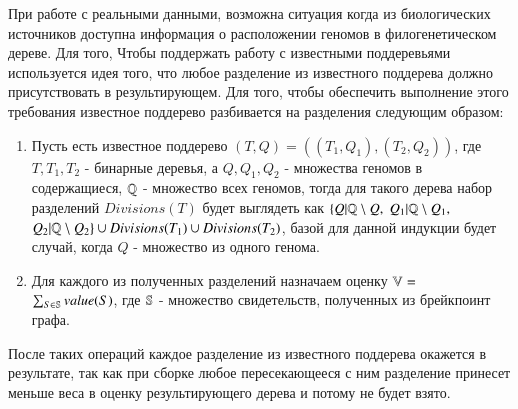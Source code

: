 При работе с реальными данными, возможна ситуация когда из биологических источников доступна информация о расположении геномов в филогенетическом дереве.
Для того, Чтобы поддержать работу с известными поддеревьями используется идея того, что любое разделение из известного поддерева должно присутствовать в результирующем.
Для того, чтобы обеспечить выполнение этого требования известное поддерево разбивается на разделения следующим образом:
\begin{enumerate}
  \item Пусть есть известное поддерево $(T, Q) = ((T_1, Q_1), (T_2, Q_2))$, где $T, T_1, T_2$ - бинарные деревья,
    а $Q, Q_1, Q_2$ - множества геномов в содержащиеся, $\mathbb{Q}$ - множество всех геномов,
    тогда для такого дерева набор разделений $Divisions(T)$ будет выглядеть как
    $\{Q|\mathbb{Q} \setminus  Q,$ $Q_1|\mathbb{Q} \setminus Q_1,$ $Q_2|\mathbb{Q} \setminus Q_2\} \cup Divisions(T_1) \cup Divisions(T_2)$,
    базой для данной индукции будет случай, когда $Q$ - множество из одного генома.
  \item Для каждого из полученных разделений назначаем оценку $\mathbb{V}=$ \\
    $\sum\nolimits_{S \in \mathbb{S}} value(S)$, где $\mathbb{S}$ - множество свидетельств, полученных из брейкпоинт графа.
\end{enumerate}
После таких операций каждое разделение из известного поддерева окажется в результате, так как при сборке любое пересекающееся с ним разделение
принесет меньше веса в оценку результирующего дерева и потому не будет взято.
